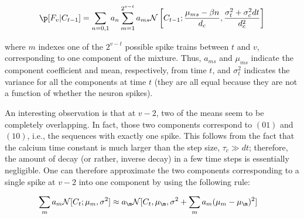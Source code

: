 \begin{align}
\p[F_v | C_{t-1}] = \sum_{n=0,1} a_n
\sum_{m=1}^{2^{v-t}} a_{ms} \mathcal{N}\left[C_{t-1}; \frac{\mu_{ms} - \beta n}{d_c}, \frac{\sigma_t^2 + \sigma_c^2 dt}{d_c^2}\right] %
\end{align}

\noindent where $m$ indexes one of the $2^{v-t}$ possible spike trains between $t$ and $v$, corresponding to one component of the mixture.  Thus, $a_{ms}$ and $\mu_{ms}$ indicate the component coefficient and mean, respectively, from time $t$, and $\sigma_t^2$ indicates the variance for all the components at time $t$ (they are all equal because they are not a function of whether the neuron spikes).

An interesting observation is that at $v-2$, two of the means seem to be completely overlapping.  In fact, those two components correspond to $(01)$ and $(10)$, i.e., the sequences with exactly one spike.  This follows from the fact that the calcium time constant is much larger than the step size, $\tau_c \gg dt$; therefore, the amount of decay (or rather, inverse decay) in a few time steps is essentially negligible.  One can therefore approximate the two components corresponding to a single spike at $v-2$ into one component by using the following rule:

\begin{align} \label{aeq:mix_approx1}
\sum_m a_{m} \mathcal{N}[C_t; \mu_{m}, \sigma^2] &\approx a_{\m} \mathcal{N}[C_t, \mu_{\m}, \sigma^2 + \sum_m a_{m} (\mu_{m}-\mu_{\m})^2]
\end{align}

